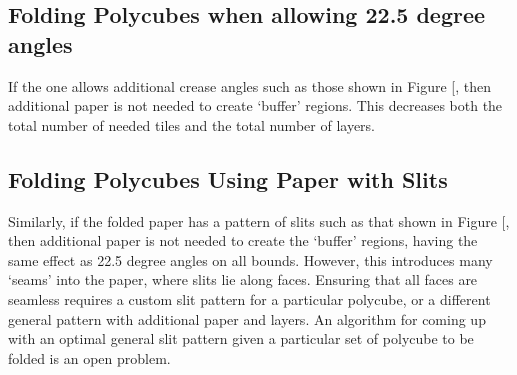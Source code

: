 \documentclass[11pt]{article}
\makeatletter
\gdef\xxx{\@ifnextchar[\xxx@lab\xxx@nolab}
\makeatother
\begin{document}
\subsection{Folding Polycubes when allowing 22.5 degree angles}
If the one allows additional crease angles such as those shown in Figure \xxx{add figure}, then additional paper is not needed to create `buffer' regions. This decreases both the total number of needed tiles and the total number of layers.
\subsection{Folding Polycubes Using Paper with Slits}
Similarly, if the folded paper has a pattern of slits such as that shown in Figure \xxx{add figure}, then additional paper is not needed to create the `buffer' regions, having the same effect as 22.5 degree angles on all bounds. However, this introduces many `seams' into the paper, where slits lie along faces. Ensuring that all faces are seamless requires a custom slit pattern for a particular polycube, or a different general pattern with additional paper and layers. An algorithm for coming up with an optimal general slit pattern given a particular set of polycube to be folded is an open problem.

\fi




\end{document}
